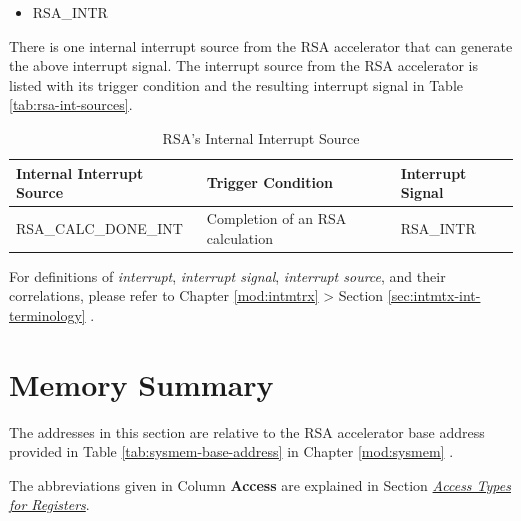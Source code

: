 \documentclass[main\_\_EN.tex]{subfiles}
\begin{document}
    \begin{itemize}
        \item RSA\_INTR
    \end{itemize}

There is one internal interrupt source from the RSA accelerator that can generate the above interrupt signal. The interrupt source from the RSA accelerator is listed with its trigger condition and the resulting interrupt signal in Table \ref{tab:rsa-int-sources}.

\begin{longtable}{ | L{5cm} | L{6.5cm} | L{4cm} | }
\caption{RSA's Internal Interrupt Source} \label{tab:rsa-int-sources}
\\ \hline
{}
\textbf{Internal Interrupt Source} & \textbf{Trigger Condition}  &  \textbf{Interrupt Signal}\\ \hline
\label{int:RSACALCDONEINT}RSA\_CALC\_DONE\_INT  & Completion of an RSA calculation &  RSA\_INTR  \\ \hline
\end{longtable}

\begin{tiplisting}
For definitions of \textit{interrupt}, \textit{interrupt signal}, \textit{interrupt source}, and their correlations, please refer to Chapter \ref{mod:intmtrx} \textit{} > Section \ref{sec:intmtx-int-terminology} \textit{}.
\end{tiplisting}

\newpage
\section{Memory Summary}\label{sec:mem-sum}
The addresses in this section are relative to the RSA accelerator base address provided in Table \ref{tab:sysmem-base-address} in Chapter \ref{mod:sysmem} \textit{}.

The abbreviations given in Column \textbf{Access} are explained in Section \hyperref[glossary-access-types]{\textit{Access Types for Registers}}.






\hypertarget{rsa-reg-summ}{}
\end{document}
